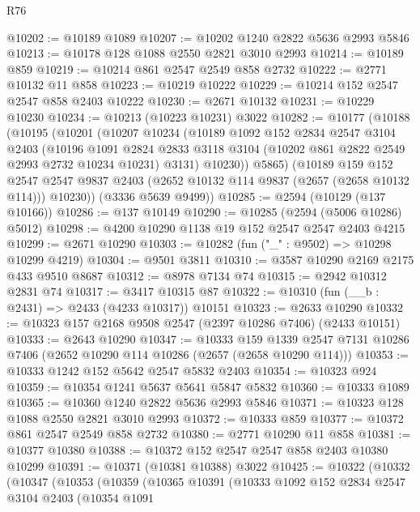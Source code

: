 \begin{lexlean}{R76}
\begin{coremodule}
@10202 := @10189 @1089
@10207 := @10202 @1240 @2822 @5636 @2993 @5846
@10213 := @10178 @128 @1088 @2550 @2821 @3010 @2993
@10214 := @10189 @859
@10219 := @10214 @861 @2547 @2549 @858 @2732
@10222 := @2771 @10132 @11 @858
@10223 := @10219 @10222
@10229 := @10214 @152 @2547 @2547 @858 @2403 @10222
@10230 := @2671 @10132
@10231 := @10229 @10230
@10234 := @10213 (@10223 @10231) @3022
@10282 := @10177
    (@10188
      (@10195
        (@10201
          (@10207
            @10234
            (@10189
              @1092
              @152
              @2834
              @2547
              @3104
              @2403
              (@10196
                @1091
                @2824
                @2833
                @3118
                @3104
                (@10202 @861 @2822 @2549 @2993 @2732 @10234 @10231)
                @3131)
              @10230))
          @5865)
        (@10189
          @159
          @152
          @2547
          @2547
          @9837
          @2403
          (@2652 @10132 @114 @9837 (@2657 (@2658 @10132 @114)))
          @10230))
      (@3336 @5639 @9499))
@10285 := @2594 (@10129 (@137 @10166))
@10286 := @137 @10149
@10290 := @10285 (@2594 (@5006 @10286) @5012)
@10298 := @4200 @10290 @1138 @19 @152 @2547 @2547 @2403 @4215
@10299 := @2671 @10290
@10303 := @10282 (fun ("_" : @9502) => @10298 @10299 @4219)
@10304 := @9501 @3811
@10310 := @3587 @10290 @2169 @2175 @433 @9510 @8687
@10312 := @8978 @7134 @74
@10315 := @2942 @10312 @2831 @74
@10317 := @3417 @10315 @87
@10322 := @10310 (fun (__b : @2431) => @2433 (@4233 @10317)) @10151
@10323 := @2633 @10290
@10332 := @10323 @157 @2168 @9508 @2547 (@2397 @10286 @7406) (@2433 @10151)
@10333 := @2643 @10290
@10347 := @10333
    @159
    @1339
    @2547
    @7131
    @10286
    @7406
    (@2652 @10290 @114 @10286 (@2657 (@2658 @10290 @114)))
@10353 := @10333 @1242 @152 @5642 @2547 @5832 @2403
@10354 := @10323 @924
@10359 := @10354 @1241 @5637 @5641 @5847 @5832
@10360 := @10333 @1089
@10365 := @10360 @1240 @2822 @5636 @2993 @5846
@10371 := @10323 @128 @1088 @2550 @2821 @3010 @2993
@10372 := @10333 @859
@10377 := @10372 @861 @2547 @2549 @858 @2732
@10380 := @2771 @10290 @11 @858
@10381 := @10377 @10380
@10388 := @10372 @152 @2547 @2547 @858 @2403 @10380 @10299
@10391 := @10371 (@10381 @10388) @3022
@10425 := @10322
    (@10332
      (@10347
        (@10353
          (@10359
            (@10365
              @10391
              (@10333
                @1092
                @152
                @2834
                @2547
                @3104
                @2403
                (@10354
                  @1091

\end{coremodule}
\end{lexlean}
